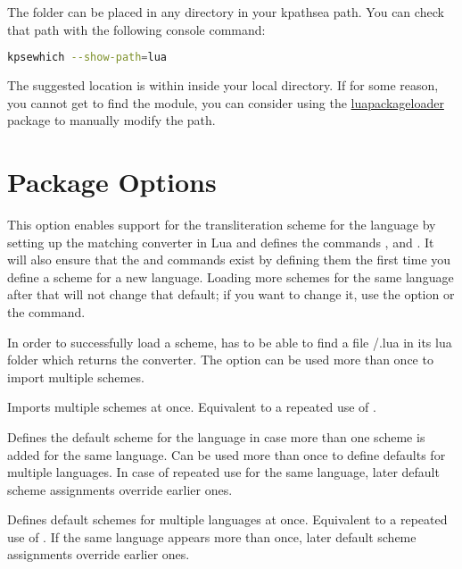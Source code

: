 \documentclass{ltxdockit}
\begin{document}
The  folder can be placed in any directory in your kpathsea path.
You can check that path with the following console command:

\begin{lstlisting}[language=bash]
  kpsewhich --show-path=lua
\end{lstlisting}

The suggested location is within  inside your
local  directory. If for some reason, you cannot get  to
find the module, you can consider using the
\href{https://www.ctan.org/pkg/luapackageloader}{luapackageloader} package to
manually modify the path.

\section{Package Options}

\begin{optionlist}

  This option enables support for the transliteration scheme  for
  the language  by setting up the matching converter in Lua and
  defines the commands ,
   and
  . It will also ensure that the
   and 
  commands exist by defining them the first time you define a scheme for a new
  language. Loading more schemes for the same language after that will not
  change that default; if you want to change it, use the 
  option or the  command.

  In order to successfully load a scheme,  has to be able to find
  a file /.lua in its lua folder which returns the
  converter. The option can be used more than once to import multiple schemes.


  Imports multiple schemes at once. Equivalent to a repeated use of
  .


  Defines the default scheme for the language  in case more than one
  scheme is added for the same language. Can be used more than once to define
  defaults for multiple languages. In case of repeated use for the same
  language, later default scheme assignments override earlier ones.


  Defines default schemes for multiple languages at once. Equivalent to a
  repeated use of . If the same language appears more than
  once, later default scheme assignments override earlier ones.

\end{optionlist}
\end{document}

